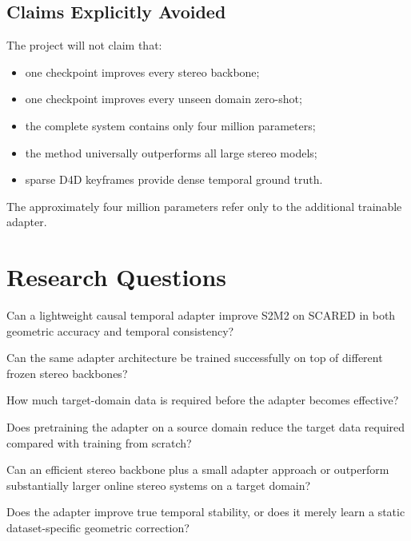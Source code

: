 \documentclass[11pt,a4paper]{article}
\newcommand{\smodel}{S2M2}
\begin{document}
\subsection{Claims Explicitly Avoided}

The project will not claim that:

\begin{itemize}[leftmargin=*]
    \item one checkpoint improves every stereo backbone;
    \item one checkpoint improves every unseen domain zero-shot;
    \item the complete system contains only four million parameters;
    \item the method universally outperforms all large stereo models;
    \item sparse D4D keyframes provide dense temporal ground truth.
\end{itemize}

The approximately four million parameters refer only to the additional trainable
adapter.

\section{Research Questions}

\begin{description}[leftmargin=1.3cm,style=nextline]
    \item[RQ1]
    Can a lightweight causal temporal adapter improve \smodel{} on SCARED in both
    geometric accuracy and temporal consistency?

    \item[RQ2]
    Can the same adapter architecture be trained successfully on top of different
    frozen stereo backbones?

    \item[RQ3]
    How much target-domain data is required before the adapter becomes effective?

    \item[RQ4]
    Does pretraining the adapter on a source domain reduce the target data required
    compared with training from scratch?

    \item[RQ5]
    Can an efficient stereo backbone plus a small adapter approach or outperform
    substantially larger online stereo systems on a target domain?

    \item[RQ6]
    Does the adapter improve true temporal stability, or does it merely learn a
    static dataset-specific geometric correction?
\end{description}
\end{document}
